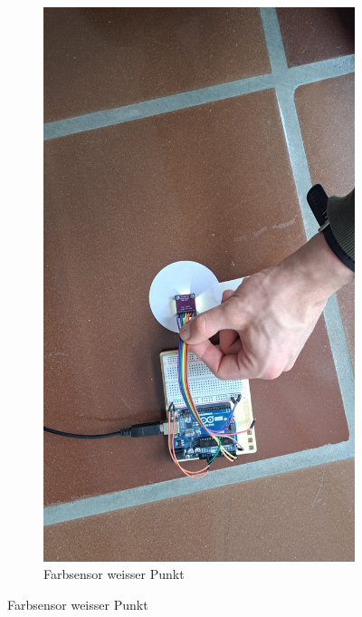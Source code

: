 \begin{figure}[H]
\begin{subfigure}{0.45\textwidth}
        \centering
        \includegraphics[width=\linewidth]{img/sensortest/Farbsensor_WeisserPunkt.jpg}
        \caption{Farbsensor weisser Punkt}
        \label{fig:FarbsensorWeisserPunkt}
    \end{subfigure}
    
    \vspace{0.5cm}


\end{figure}

